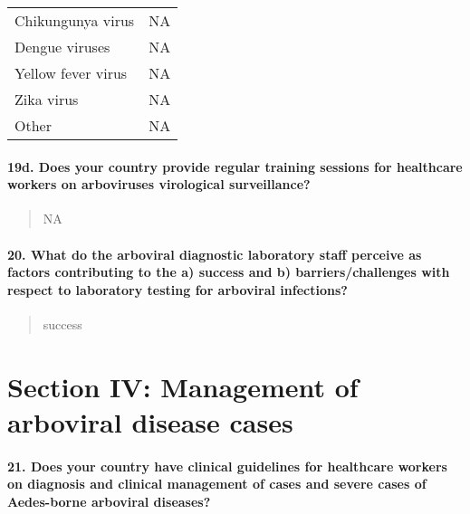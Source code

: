 \documentclass[
]{article}
\begin{document}
\begin{longtable}[]{@{}ll@{}}
\toprule
\endhead
Chikungunya virus & NA \\
Dengue viruses & NA \\
Yellow fever virus & NA \\
Zika virus & NA \\
Other & NA \\
\bottomrule
\end{longtable}

\hypertarget{d.-does-your-country-provide-regular-training-sessions-for-healthcare-workers-on-arboviruses-virological-surveillance}{%
\paragraph{19d. Does your country provide regular training sessions for
healthcare workers on arboviruses virological
surveillance?}\label{d.-does-your-country-provide-regular-training-sessions-for-healthcare-workers-on-arboviruses-virological-surveillance}}

\begin{quote}
NA
\end{quote}

\hypertarget{what-do-the-arboviral-diagnostic-laboratory-staff-perceive-as-factors-contributing-to-the-a-success-and-b-barrierschallenges-with-respect-to-laboratory-testing-for-arboviral-infections}{%
\paragraph{20. What do the arboviral diagnostic laboratory staff
perceive as factors contributing to the a) success and b)
barriers/challenges with respect to laboratory testing for arboviral
infections?}\label{what-do-the-arboviral-diagnostic-laboratory-staff-perceive-as-factors-contributing-to-the-a-success-and-b-barrierschallenges-with-respect-to-laboratory-testing-for-arboviral-infections}}

\begin{quote}
success
\end{quote}

\hypertarget{section-iv-management-of-arboviral-disease-cases}{%
\section{Section IV: Management of arboviral disease
cases}\label{section-iv-management-of-arboviral-disease-cases}}

\hypertarget{does-your-country-have-clinical-guidelines-for-healthcare-workers-on-diagnosis-and-clinical-management-of-cases-and-severe-cases-of-aedes-borne-arboviral-diseases}{%
\paragraph{21. Does your country have clinical guidelines for healthcare
workers on diagnosis and clinical management of cases and severe cases
of Aedes-borne arboviral
diseases?}\label{does-your-country-have-clinical-guidelines-for-healthcare-workers-on-diagnosis-and-clinical-management-of-cases-and-severe-cases-of-aedes-borne-arboviral-diseases}}
\end{document}
